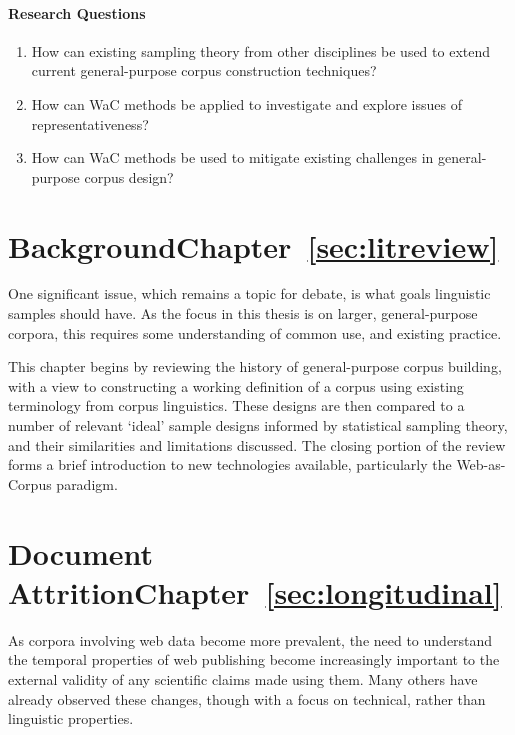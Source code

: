 \paragraph{Research Questions}
\begin{enumerate}[label=\textbf{RQ\arabic*}]
    \item \label{rq1} How can existing sampling theory from other disciplines be used to extend current general-purpose corpus construction techniques?
    \item \label{rq2} How can WaC methods be applied to investigate and explore issues of representativeness?
    \item \label{rq3} How can WaC methods be used to mitigate existing challenges in general-purpose corpus design?

\end{enumerate}



\section*{Background\hfill{}Chapter~\ref{sec:litreview}}
One significant issue, which remains a topic for debate, is what goals linguistic samples should have.  As the focus in this thesis is on larger, general-purpose corpora, this requires some understanding of common use, and existing practice.

This chapter begins by reviewing the history of general-purpose corpus building, with a view to constructing a working definition of a corpus using existing terminology from corpus linguistics.  These designs are then compared to a number of relevant `ideal' sample designs informed by statistical sampling theory, and their similarities and limitations discussed.  The closing portion of the review forms a brief introduction to new technologies available, particularly the Web-as-Corpus paradigm.


\section*{Document Attrition\hfill{}Chapter~\ref{sec:longitudinal}}
As corpora involving web data become more prevalent, the need to understand the temporal properties of web publishing become increasingly important to the external validity of any scientific claims made using them.  Many others have already observed these changes, though with a focus on technical, rather than linguistic properties.


